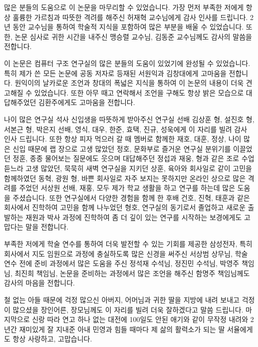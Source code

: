 
\acknowledgement[korean]


많은 분들의 도움으로 이 논문을 마무리할 수 있었습니다. 
가장 먼저 부족한 저에게 항상 훌륭한 가르침과 따뜻한 격려를 해주신 허재혁 교수님에게 감사 인사를 드립니다. 
2년 동안 교수님을 통하여 학술적 지식을 포함하여 많은 부분을 배울 수 있었습니다. 
또한, 논문 심사로 귀한 시간을 내주신 맹승렬 교수님, 김동준 교수님께도 감사의 말씀을 전합니다. 


이 논문은 컴퓨터 구조 연구실의 많은 분들의 도움이 있었기에 완성될 수 있었습니다. 
특히 제가 쓴 모든 논문에 공동 저자로 등재된 서원익과 김창대에게 고마움을 전합니다. 
원익이의 날카로운 조언과 창대의 폭넓은 지식을 통하여 이 논문의 내용이 더욱 견고해질 수 있었습니다. 
또한 아무 때고 연락해서 조언을 구해도 항상 밝은 모습으로 대답해주었던 김환주에게도 고마움을 전합니다. 

나이 많은 연구실 석사 신입생을 따뜻하게 받아주신 연구실 선배 김상훈 형, 설진호 형, 서본근 형, 박은지 선배, 영식, 대우, 한준, 효택, 진규, 성욱에게 이 자리를 빌려 감사 인사 드립니다. 
또한 항상 피자 먹으러 갈 때 멤버로 함께한 재호, 대훈, 정상, 나이 많은 신입 때문에 랩 장으로 고생 많았던 정호,
문화부로 즐거운 연구실 분위기를 이끌었던 정훈, 종종 물어보는 질문에도 웃으며 대답해주던 정섭과 재웅, 
형과 같은 조로 수업 듣느라 고생 많았던, 묵묵히 새벽 연구실을 지키던 상훈, 
육아와 회사일로 같이 고민을 함께하였던 동혁, 광원 형, 바쁜 회사일로 자주 보지는 못하지만 온라인 상으로 많은 격려를 주었던 서상원 선배, 재홍, 모두 제가 학교 생활을 하고 연구를 하는데 많은 도움을 주셨습니다. 
또한 연구실에서 다양한 경험을 함께 한 후배 건호, 진혁, 태훈과 같은 회사에서 진학하여 고민을 함께 나누었던 형호, 
연구실의 동기로서 졸업하고 새로운 출발하는 재원과 박사 과정에 진학하여 좀 더 깊이 있는 연구를 시작하는 보경에게도 고맙다는 말을 전합니다.

부족한 저에게 학술 연수를 통하여 더욱 발전할 수 있는 기회를 제공한 삼성전자, 특히 회사에서 지도 임원으로 과정에 충실하도록 많은 신경을 써주신 서상범 상무님, 학술 연수 전에 준비 과정에서 많은 도움을 주신 정석재 수석님, 
정진민 수석님, 박영주 책임님, 최진희 책임님, 논문을 준비하는 과정에서 많은 조언을 해주신 함명주 책임님께도 감사의 마음을 전합니다. 

철 없는 아들 때문에 걱정 많으신 아버지, 어머님과 귀한 딸을 지방에 내려 보내고 걱정이 많으셨을 장인어른, 장모님께도 이 자리를 빌려 더욱 잘하겠다고 말씀 드립니다. 마지막으로 신랑 따라 연고 하나 없는 대전에 100일도 안된 애기와 같이 무작정 내려와 2년간 재미있게 잘 지내준 아내 민영과 힘들 때마다 제 삶의 활력소가 되는 딸 서율에게도 항상 사랑하고, 고맙습니다. 
